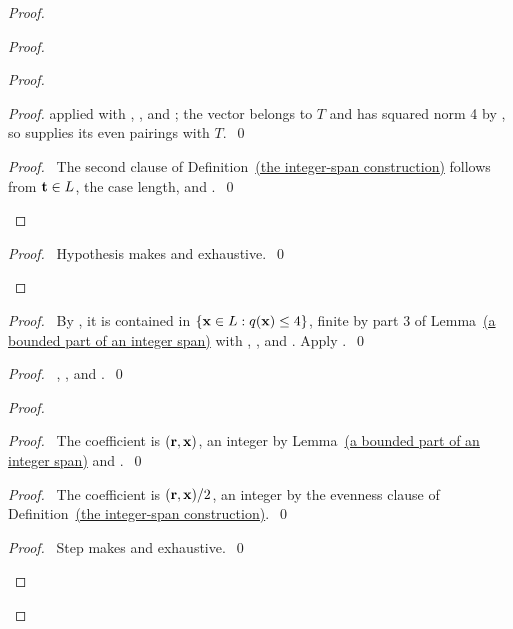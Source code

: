 \begin{mergedproofsection}
\begin{proof}
\begin{proof}
\begin{proof}
\begin{proof}
  applied with , , and ;
  the vector belongs to $T$ and has squared norm 4 by ,
  so  supplies its even pairings with $T$.~\qed\end{proof}
  \qedstep
  \begin{proof}\pf\ The second clause of Definition~\hyperref[def:312-integral-roots]{(the integer-span construction)}
  follows from ${\mathbf t}\in L$, the case length, and .~\qed\end{proof}
 \end{proof}
 \qedstep
 \begin{proof}\pf\ Hypothesis  makes
  and  exhaustive.~\qed\end{proof}
\end{proof}
\begin{proof}\pf\ By , it is contained in
$\{{\mathbf x}\in L:q({\mathbf x})\leq4\}$, finite by part 3 of
Lemma~\hyperref[lem:312-integer-span]{(a bounded part of an integer span)} with , , and
. Apply .~\qed\end{proof}
\begin{proof}\pf\ , , and .~\qed\end{proof}
\begin{proof}
 \begin{proof}\pf\ The coefficient is $({\mathbf r},{\mathbf x})$, an integer by
 Lemma~\hyperref[lem:312-integer-span]{(a bounded part of an integer span)} and .~\qed\end{proof}
 \begin{proof}\pf\ The coefficient is $({\mathbf r},{\mathbf x})/2$, an integer by the
 evenness clause of Definition~\hyperref[def:312-integral-roots]{(the integer-span construction)}.~\qed\end{proof}
 \qedstep
 \begin{proof}\pf\ Step  makes
  and  exhaustive.~\qed\end{proof}
\end{proof}

\end{proof}
\end{mergedproofsection}
